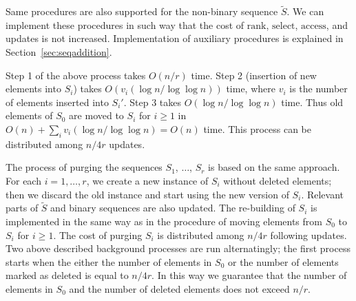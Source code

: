 \documentclass[11pt]{article}\usepackage{fullpage}
\def\idrm#1{\ensuremath{\mathrm{#1}}}
\newcommand{\tS}{{\tilde S}}
\newcommand{\ra}{\idrm{rank}}
\newcommand{\sel}{\idrm{select}}
\newcommand{\acc}{\idrm{access}}
\newcommand{\shlongver}[2]{#2}
\begin{document}
Same procedures are also supported for the non-binary sequence $\tS$.
We can implement these procedures in such way that the cost of $\ra$, $\sel$, $\acc$, and updates is not increased. Implementation of auxiliary procedures is explained in \shlongver{the full version of this paper, attached at the end of this submission}{Section~\ref{sec:seqaddition}}.

Step 1 of the above process takes $O(n/r)$ time. Step 2 (insertion of new elements into $S_i$) takes $O(v_i(\log n/\log\log n))$ time, where $v_i$ is the number of elements inserted into $S_i'$. Step 3 takes $O(\log n/\log\log n)$ time. Thus old elements of $S_0$ are moved to $S_i$ for $i\ge 1$ in 
$O(n)+\sum_i v_i(\log n/\log\log n) =O(n)$ time. This process can be distributed among $n/4r$ updates.   


The process of purging the sequences $S_1$, $\ldots$, $S_r$ is based on the same approach. 
For each $i=1,\ldots ,r$, we create a new instance of $S_i$ without  deleted elements; then we discard the old instance 
and start using the new version of $S_i$. Relevant parts of $\tS$ and binary sequences are also updated.
The re-building of $S_i$ is implemented in the same way as in the procedure of moving elements from $S_0$ to $S_i$ for $i\ge 1$.  The cost of purging $S_i$ is distributed among $n/4r$ following updates. 
Two above described background processes are run alternatingly; the first process starts when the either the number of elements in  $S_0$ or the number of elements marked as deleted is equal to $n/4r$.  In this way we guarantee that the number of elements in $S_0$ and the number of deleted elements does not exceed $n/r$.
\end{document}
